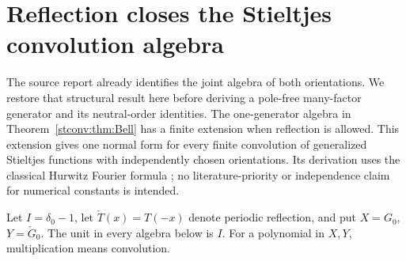 \section{Reflection closes the Stieltjes convolution algebra}
\label{stref:section}
The source report \cite{stconv:calculus-report} already identifies the joint algebra of both orientations. We restore that structural result here before deriving a pole-free many-factor generator and its neutral-order identities. The one-generator algebra in Theorem~\ref{stconv:thm:Bell} has a
finite extension when reflection is allowed. This extension gives one
normal form for every finite convolution of generalized Stieltjes
functions with independently chosen orientations. Its derivation uses
the classical Hurwitz Fourier formula \cite[Eq.~25.11.9]{intdist:DLMFHurwitz};
no literature-priority or independence claim for numerical constants
is intended.

Let $I=\delta_0-1$, let $\check T(x)=T(-x)$ denote periodic reflection,
and put $X=G_0$, $Y=\check G_0$. The unit in every algebra below is $I$.
For a polynomial in $X,Y$, multiplication means convolution.

